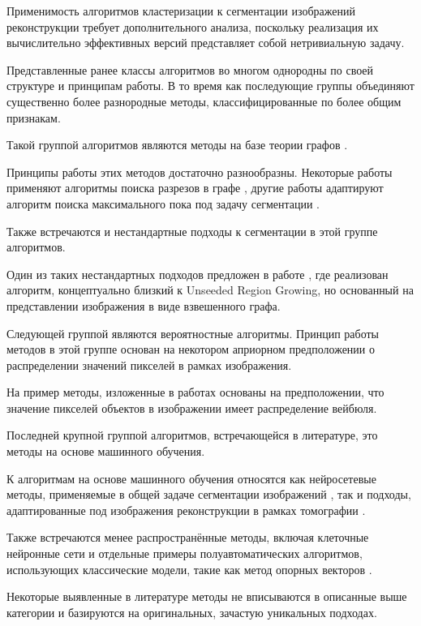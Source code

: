 Применимость алгоритмов кластеризации к сегментации изображений реконструкции требует дополнительного анализа, поскольку реализация их вычислительно эффективных версий представляет собой нетривиальную задачу.

Представленные ранее классы алгоритмов во многом однородны по своей структуре и принципам работы. В то время как последующие группы объединяют существенно более разнородные методы, классифицированные по более общим признакам.

Такой группой алгоритмов являются методы на базе теории графов \cite{camilus2012review}. 

Принципы работы этих методов достаточно разнообразны. Некоторые работы применяют алгоритмы поиска разрезов в графе \cite{boykov2003computing, peng2019interactive}, другие работы адаптируют алгоритм поиска максимального пока под задачу сегментации \cite{zeng2008topology}.

Также встречаются и нестандартные подходы к сегментации в этой группе алгоритмов.

Один из таких нестандартных подходов предложен в работе \cite{felzenszwalb2004efficient}, где реализован алгоритм, концептуально близкий к Unseeded Region Growing, но основанный на представлении изображения в виде взвешенного графа.

Следующей группой являются вероятностные алгоритмы. Принцип работы методов в этой группе основан на некотором априорном предположении о распределении значений пикселей в рамках изображения.

На пример методы, изложенные в работах \cite{hu2003volumetric, ayed2006unsupervised} основаны на предположении, что значение пикселей объектов в  изображении имеет распределение вейбюля.

Последней крупной группой алгоритмов, встречающейся в литературе, это методы на основе машинного обучения.

К алгоритмам на основе машинного обучения относятся как нейросетевые методы, применяемые в общей задаче сегментации изображений \cite{lu20193d, ха2016свёрточная}, так и подходы, адаптированные под изображения реконструкции в рамках томографии \cite{milletari2016v}. 

Также встречаются менее распространённые методы, включая клеточные нейронные сети \cite{liu2011industrial} и отдельные примеры полуавтоматических алгоритмов, использующих классические модели, такие как метод опорных векторов \cite{lang2022ai, gonella2019semi}.

Некоторые выявленные в литературе методы не вписываются в описанные выше категории и базируются на оригинальных, зачастую уникальных подходах. 

